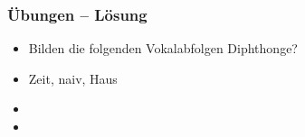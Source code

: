 
\begin{frame}
\frametitle{Übungen -- Lösung}

\begin{itemize}
	\item Bilden die folgenden Vokalabfolgen Diphthonge?
	\item[] Zeit, naiv, Haus
	
	\item {}
	\item {}
\end{itemize}

\end{frame}